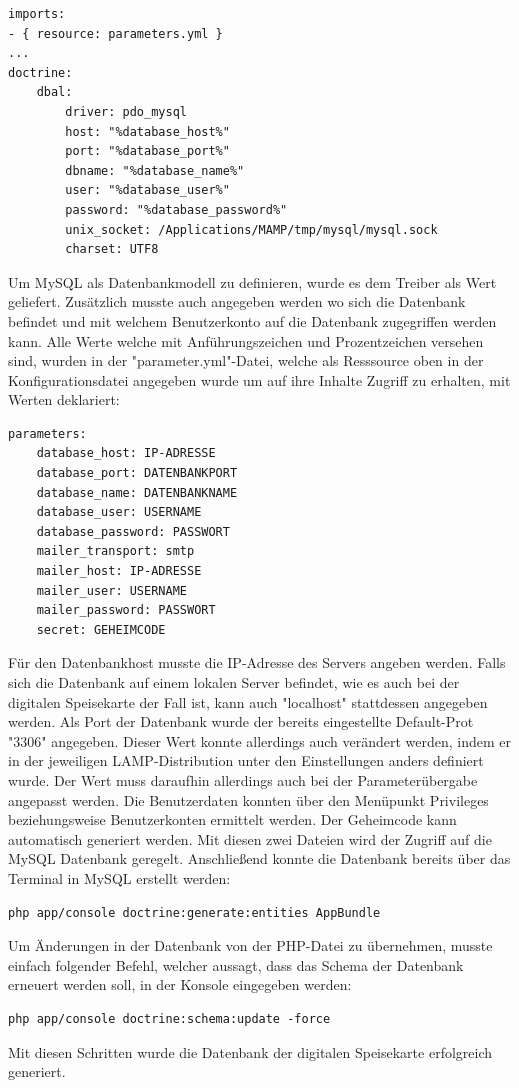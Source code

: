 	\lstset{language=php}
  	\begin{lstlisting}
imports:
- { resource: parameters.yml }
...
doctrine:
	dbal:
		driver: pdo_mysql
		host: "%database_host%"
		port: "%database_port%"
		dbname: "%database_name%"
		user: "%database_user%"
		password: "%database_password%"
		unix_socket: /Applications/MAMP/tmp/mysql/mysql.sock
		charset: UTF8
  	\end{lstlisting}
Um MySQL als Datenbankmodell zu definieren, wurde es dem Treiber als Wert geliefert. Zusätzlich musste auch angegeben werden wo sich die Datenbank befindet und mit welchem Benutzerkonto auf die Datenbank zugegriffen werden kann.
Alle Werte welche mit Anführungszeichen und Prozentzeichen versehen sind, wurden in der "parameter.yml"-Datei, welche als Resssource oben in der Konfigurationsdatei angegeben wurde um auf ihre Inhalte Zugriff zu erhalten, mit Werten deklariert:
	\lstset{language=php}
  	\begin{lstlisting}
parameters:
    database_host: IP-ADRESSE
    database_port: DATENBANKPORT
    database_name: DATENBANKNAME
    database_user: USERNAME
    database_password: PASSWORT
    mailer_transport: smtp
    mailer_host: IP-ADRESSE
    mailer_user: USERNAME
    mailer_password: PASSWORT
    secret: GEHEIMCODE
  	\end{lstlisting}
Für den Datenbankhost musste die IP-Adresse des Servers angeben werden. Falls sich die Datenbank auf einem lokalen Server befindet, wie es auch bei der digitalen Speisekarte der Fall ist, kann auch "localhost" stattdessen angegeben werden. Als Port der Datenbank wurde der bereits eingestellte Default-Prot "3306" angegeben. Dieser Wert konnte allerdings auch verändert werden, indem er in der jeweiligen LAMP-Distribution unter den Einstellungen anders definiert wurde. Der Wert muss daraufhin allerdings auch bei der Parameterübergabe angepasst werden. Die Benutzerdaten konnten über den Menüpunkt Privileges beziehungsweise Benutzerkonten ermittelt werden. Der Geheimcode kann automatisch generiert werden.
Mit diesen zwei Dateien wird der Zugriff auf die MySQL Datenbank geregelt.
Anschließend konnte die Datenbank bereits über das Terminal in MySQL erstellt werden:
	\lstset{language = bash}
  	\begin{lstlisting}
php app/console doctrine:generate:entities AppBundle
  	\end{lstlisting}
Um Änderungen in der Datenbank von der PHP-Datei zu übernehmen, musste einfach folgender Befehl, welcher aussagt, dass das Schema der Datenbank erneuert werden soll, in der Konsole eingegeben werden:
	\lstset{language=php}
  	\begin{lstlisting}
php app/console doctrine:schema:update -force
  	\end{lstlisting}
Mit diesen Schritten wurde die Datenbank der digitalen Speisekarte erfolgreich generiert.

